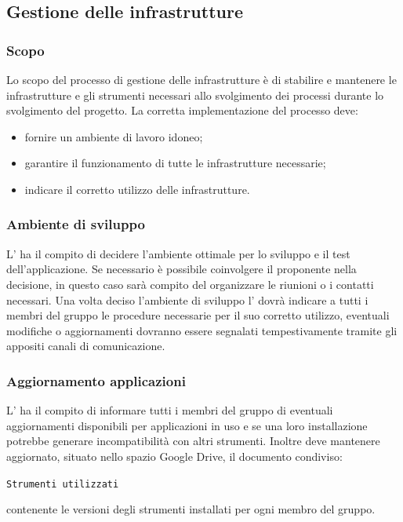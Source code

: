         
    \subsection{Gestione delle infrastrutture}
        \subsubsection{Scopo}
        Lo scopo del processo di gestione delle infrastrutture è di stabilire e mantenere le infrastrutture e gli strumenti necessari allo svolgimento dei processi durante lo svolgimento del progetto. La corretta implementazione del processo deve:
        \begin{itemize}
            \item fornire un ambiente di lavoro idoneo;
            \item garantire il funzionamento di tutte le infrastrutture necessarie;
            \item indicare il corretto utilizzo delle infrastrutture.
        \end{itemize}

		\subsubsection{Ambiente di sviluppo}
		L'\amministratore{} ha il compito di decidere l'ambiente ottimale per lo sviluppo e il test dell'applicazione. Se necessario è possibile coinvolgere il proponente nella decisione, in questo caso sarà compito del \responsabilediprogetto{} organizzare le riunioni o i contatti necessari.
		Una volta deciso l'ambiente di sviluppo l'\amministratore{} dovrà indicare a tutti i membri del gruppo le procedure necessarie per il suo corretto utilizzo, eventuali modifiche o aggiornamenti dovranno essere segnalati tempestivamente tramite gli appositi canali di comunicazione.

        \subsubsection{Aggiornamento applicazioni}
        L'\amministratore{} ha il compito di informare tutti i membri del gruppo di eventuali aggiornamenti disponibili per applicazioni in uso e se una loro installazione potrebbe generare incompatibilità con altri strumenti.
        Inoltre deve mantenere aggiornato, situato nello spazio Google Drive, il documento condiviso:
        \begin{center}
        	\texttt{Strumenti utilizzati}
        \end{center}
        contenente le versioni degli strumenti installati per ogni membro del gruppo.
        
